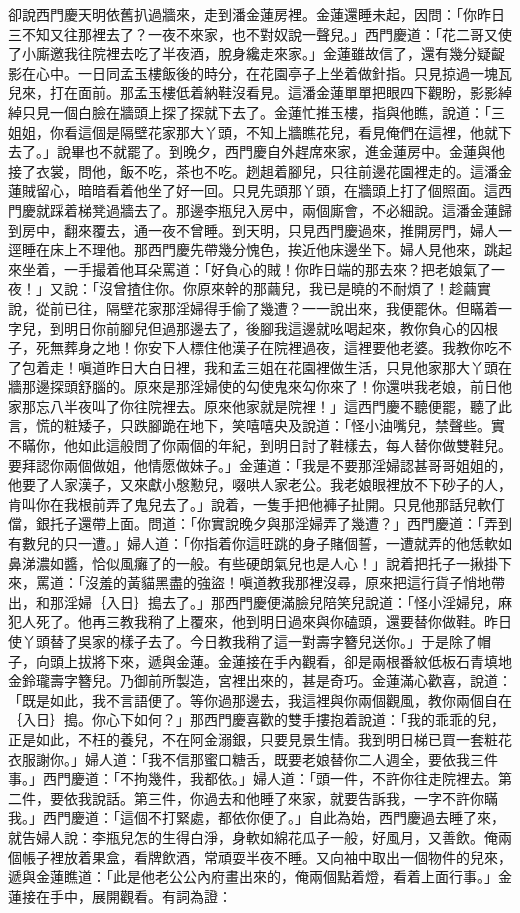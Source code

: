 卻說西門慶天明依舊扒過牆來，走到潘金蓮房裡。金蓮還睡未起，因問：「你昨日三不知又往那裡去了？一夜不來家，也不對奴說一聲兒。」西門慶道：「花二哥又使了小廝邀我往院裡去吃了半夜酒，脫身纔走來家。」金蓮雖故信了，還有幾分疑齪影在心中。一日同孟玉樓飯後的時分，在花園亭子上坐着做針指。只見掠過一塊瓦兒來，打在面前。那孟玉樓低着納鞋沒看見。這潘金蓮單單把眼四下觀盼，影影綽綽只見一個白臉在牆頭上探了探就下去了。金蓮忙推玉樓，指與他瞧，說道：「三姐姐，你看這個是隔壁花家那大丫頭，不知上牆瞧花兒，看見俺們在這裡，他就下去了。」說畢也不就罷了。到晚夕，西門慶自外趕席來家，進金蓮房中。金蓮與他接了衣裳，問他，飯不吃，茶也不吃。趔趄着腳兒，只往前邊花園裡走的。這潘金蓮賊留心，暗暗看着他坐了好一回。只見先頭那丫頭，在牆頭上打了個照面。這西門慶就踩着梯凳過牆去了。那邊李瓶兒入房中，兩個廝會，不必細說。這潘金蓮歸到房中，翻來覆去，通一夜不曾睡。到天明，只見西門慶過來，推開房門，婦人一逕睡在床上不理他。那西門慶先帶幾分愧色，挨近他床邊坐下。婦人見他來，跳起來坐着，一手撮着他耳朵罵道：「好負心的賊！你昨日端的那去來？把老娘氣了一夜！」又說：「沒曾揸住你。你原來幹的那繭兒，我已是曉的不耐煩了！趁繭實說，從前已往，隔壁花家那淫婦得手偷了幾遭？一一說出來，我便罷休。但瞞着一字兒，到明日你前腳兒但過那邊去了，後腳我這邊就吆喝起來，教你負心的囚根子，死無葬身之地！你安下人標住他漢子在院裡過夜，這裡要他老婆。我教你吃不了包着走！嗔道昨日大白日裡，我和孟三姐在花園裡做生活，只見他家那大丫頭在牆那邊探頭舒腦的。原來是那淫婦使的勾使鬼來勾你來了！你還哄我老娘，前日他家那忘八半夜叫了你往院裡去。原來他家就是院裡！」這西門慶不聽便罷，聽了此言，慌的粧矮子，只跌腳跪在地下，笑嘻嘻央及說道：「怪小油嘴兒，禁聲些。實不瞞你，他如此這般問了你兩個的年紀，到明日討了鞋樣去，每人替你做雙鞋兒。要拜認你兩個做姐，他情愿做妹子。」金蓮道：「我是不要那淫婦認甚哥哥姐姐的，他要了人家漢子，又來獻小慇懃兒，啜哄人家老公。我老娘眼裡放不下砂子的人，肯叫你在我根前弄了鬼兒去了。」說着，一隻手把他褲子扯開。只見他那話兒軟仃儅，銀托子還帶上面。問道：「你實說晚夕與那淫婦弄了幾遭？」西門慶道：「弄到有數兒的只一遭。」婦人道：「你指着你這旺跳的身子賭個誓，一遭就弄的他恁軟如鼻涕濃如醬，恰似風癱了的一般。有些硬朗氣兒也是人心！」說着把托子一揪掛下來，罵道：「沒羞的黃貓黑盡的強盜！嗔道教我那裡沒尋，原來把這行貨子悄地帶出，和那淫婦｛入日｝搗去了。」那西門慶便滿臉兒陪笑兒說道：「怪小淫婦兒，麻犯人死了。他再三教我稍了上覆來，他到明日過來與你磕頭，還要替你做鞋。昨日使丫頭替了吳家的樣子去了。今日教我稍了這一對壽字簪兒送你。」于是除了帽子，向頭上拔將下來，遞與金蓮。金蓮接在手內觀看，卻是兩根番紋低板石青填地金鈴瓏壽字簪兒。乃御前所製造，宮裡出來的，甚是奇巧。金蓮滿心歡喜，說道：「既是如此，我不言語便了。等你過那邊去，我這裡與你兩個觀風，教你兩個自在｛入日｝搗。你心下如何？」那西門慶喜歡的雙手摟抱着說道：「我的乖乖的兒，正是如此，不枉的養兒，不在阿金溺銀，只要見景生情。我到明日梯已買一套粧花衣服謝你。」婦人道：「我不信那蜜口糖舌，既要老娘替你二人週全，要依我三件事。」西門慶道：「不拘幾件，我都依。」婦人道：「頭一件，不許你往走院裡去。第二件，要依我說話。第三件，你過去和他睡了來家，就要告訴我，一字不許你瞞我。」西門慶道：「這個不打緊處，都依你便了。」自此為始，西門慶過去睡了來，就告婦人說：李瓶兒怎的生得白淨，身軟如綿花瓜子一般，好風月，又善飲。俺兩個帳子裡放着果盒，看牌飲酒，常頑耍半夜不睡。又向袖中取出一個物件的兒來，遞與金蓮瞧道：「此是他老公公內府畫出來的，俺兩個點着燈，看着上面行事。」金蓮接在手中，展開觀看。有詞為證：

